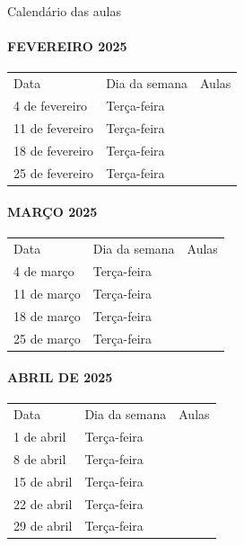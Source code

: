 \documentclass[
]{book}
\begin{document}
Calendário das aulas

\paragraph{FEVEREIRO 2025}\label{fevereiro-2025}

\begin{longtable}[]{@{}lll@{}}
\toprule\noalign{}
\endhead
\bottomrule\noalign{}
\endlastfoot
Data & Dia da semana & Aulas \\
4 de fevereiro & Terça-feira & \\
11 de fevereiro & Terça-feira & \\
18 de fevereiro & Terça-feira & \\
25 de fevereiro & Terça-feira & \\
\end{longtable}

\paragraph{MARÇO 2025}\label{maruxe7o-2025}

\begin{longtable}[]{@{}lll@{}}
\toprule\noalign{}
\endhead
\bottomrule\noalign{}
\endlastfoot
Data & Dia da semana & Aulas \\
4 de março & Terça-feira & \\
11 de março & Terça-feira & \\
18 de março & Terça-feira & \\
25 de março & Terça-feira & \\
\end{longtable}

\paragraph{ABRIL DE 2025}\label{abril-de-2025}

\begin{longtable}[]{@{}lll@{}}
\toprule\noalign{}
\endhead
\bottomrule\noalign{}
\endlastfoot
Data & Dia da semana & Aulas \\
1 de abril & Terça-feira & \\
8 de abril & Terça-feira & \\
15 de abril & Terça-feira & \\
22 de abril & Terça-feira & \\
29 de abril & Terça-feira & \\
\end{longtable}
\end{document}
